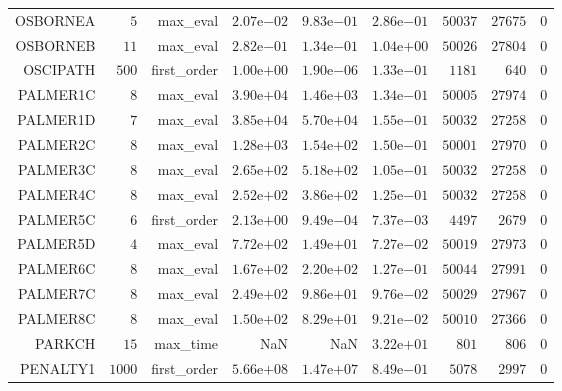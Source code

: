 \begin{longtable}{rrrrrrrrr}
OSBORNEA & \(     5\) & max\_eval & \( 2.07\)e\(-02\) & \( 9.83\)e\(-01\) & \( 2.86\)e\(-01\) & \( 50037\) & \( 27675\) & \(     0\) \\
OSBORNEB & \(    11\) & max\_eval & \( 2.82\)e\(-01\) & \( 1.34\)e\(-01\) & \( 1.04\)e\(+00\) & \( 50026\) & \( 27804\) & \(     0\) \\
OSCIPATH & \(   500\) & first\_order & \( 1.00\)e\(+00\) & \( 1.90\)e\(-06\) & \( 1.33\)e\(-01\) & \(  1181\) & \(   640\) & \(     0\) \\
PALMER1C & \(     8\) & max\_eval & \( 3.90\)e\(+04\) & \( 1.46\)e\(+03\) & \( 1.34\)e\(-01\) & \( 50005\) & \( 27974\) & \(     0\) \\
PALMER1D & \(     7\) & max\_eval & \( 3.85\)e\(+04\) & \( 5.70\)e\(+04\) & \( 1.55\)e\(-01\) & \( 50032\) & \( 27258\) & \(     0\) \\
PALMER2C & \(     8\) & max\_eval & \( 1.28\)e\(+03\) & \( 1.54\)e\(+02\) & \( 1.50\)e\(-01\) & \( 50001\) & \( 27970\) & \(     0\) \\
PALMER3C & \(     8\) & max\_eval & \( 2.65\)e\(+02\) & \( 5.18\)e\(+02\) & \( 1.05\)e\(-01\) & \( 50032\) & \( 27258\) & \(     0\) \\
PALMER4C & \(     8\) & max\_eval & \( 2.52\)e\(+02\) & \( 3.86\)e\(+02\) & \( 1.25\)e\(-01\) & \( 50032\) & \( 27258\) & \(     0\) \\
PALMER5C & \(     6\) & first\_order & \( 2.13\)e\(+00\) & \( 9.49\)e\(-04\) & \( 7.37\)e\(-03\) & \(  4497\) & \(  2679\) & \(     0\) \\
PALMER5D & \(     4\) & max\_eval & \( 7.72\)e\(+02\) & \( 1.49\)e\(+01\) & \( 7.27\)e\(-02\) & \( 50019\) & \( 27973\) & \(     0\) \\
PALMER6C & \(     8\) & max\_eval & \( 1.67\)e\(+02\) & \( 2.20\)e\(+02\) & \( 1.27\)e\(-01\) & \( 50044\) & \( 27991\) & \(     0\) \\
PALMER7C & \(     8\) & max\_eval & \( 2.49\)e\(+02\) & \( 9.86\)e\(+01\) & \( 9.76\)e\(-02\) & \( 50029\) & \( 27967\) & \(     0\) \\
PALMER8C & \(     8\) & max\_eval & \( 1.50\)e\(+02\) & \( 8.29\)e\(+01\) & \( 9.21\)e\(-02\) & \( 50010\) & \( 27366\) & \(     0\) \\
PARKCH & \(    15\) & max\_time &       NaN &       NaN & \( 3.22\)e\(+01\) & \(   801\) & \(   806\) & \(     0\) \\
PENALTY1 & \(  1000\) & first\_order & \( 5.66\)e\(+08\) & \( 1.47\)e\(+07\) & \( 8.49\)e\(-01\) & \(  5078\) & \(  2997\) & \(     0\) \\

\end{longtable}
